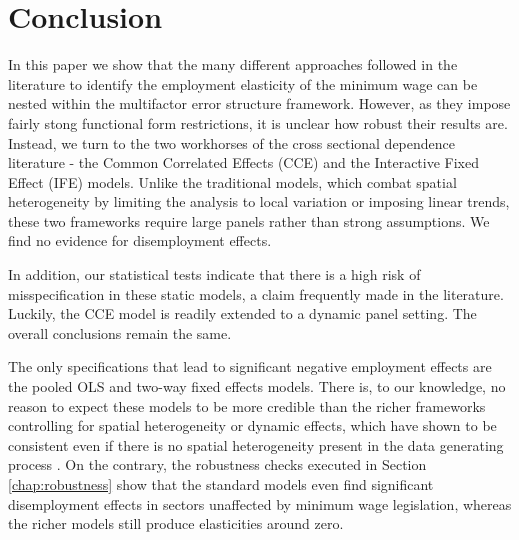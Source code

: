 
\section{Conclusion}
In this paper we show that the many different approaches followed in the literature to identify the employment elasticity of the minimum wage can be nested within the multifactor error structure framework. However, as they impose fairly stong functional form restrictions, it is unclear how robust their results are. Instead, we turn to the two workhorses of the cross sectional dependence literature - the Common Correlated Effects (CCE) and the Interactive Fixed Effect (IFE) models. Unlike the traditional models, which combat spatial heterogeneity by limiting the analysis to local variation or imposing linear trends, these two frameworks require large panels rather than strong assumptions. We find no evidence for disemployment effects. 

In addition, our statistical tests indicate that there is a high risk of misspecification in these static models, a claim frequently made in the literature. Luckily, the CCE model is readily extended to a dynamic panel setting. The overall conclusions remain the same.

The only specifications that lead to significant negative employment effects are the pooled OLS and two-way fixed effects models. There is, to our knowledge, no reason to expect these models to be more credible than the richer frameworks controlling for spatial heterogeneity or dynamic effects, which have shown to be consistent even if there is no spatial heterogeneity present in the data generating process \citep{Eberhardt2010}. On the contrary, the robustness checks executed in Section \ref{chap:robustness} show that the standard models even find significant disemployment effects in sectors unaffected by minimum wage legislation, whereas the richer models still produce elasticities around zero.
